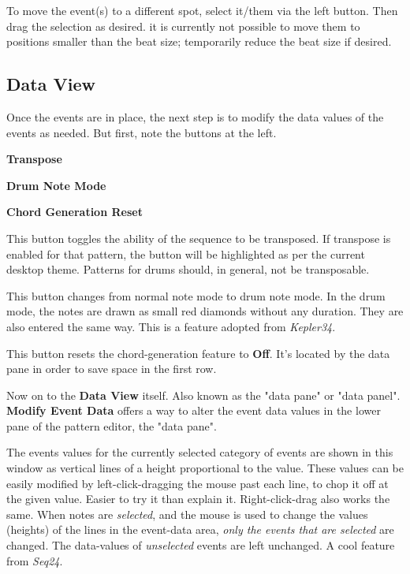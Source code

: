    To move the event(s) to a different spot, select it/them via the left
   button.  Then drag the selection as desired.
   it is currently not possible to move them to positions smaller than the
   beat size; temporarily reduce the beat size if desired.

\subsection{Data View}
\label{subsec:pattern_editor_data_view}

   Once the events are in place, the next step is to modify the
   data values of the events as needed.
   But first, note the buttons at the left.

   \begin{enumber}
      \item \textbf{Transpose}
      \item \textbf{Drum Note Mode}
      \item \textbf{Chord Generation Reset}
   \end{enumber}

   \setcounter{ItemCounter}{0}      %

   This button toggles the ability of the sequence to be transposed.
   If transpose is enabled for that pattern, the button will be highlighted as
   per the current desktop theme.  Patterns for drums should, in general, not
   be transposable.

   This button changes from normal note mode to drum note mode. In the drum
   mode, the notes are drawn as small red diamonds without any duration.
   They are also entered the same way.
   This is a feature adopted from \textsl{Kepler34}.

   This button resets the chord-generation feature to \textbf{Off}.
   It's located by the data pane in order to save space in the first row.

   Now on to the \textbf{Data View} itself.
   Also known as the "data pane"
   or "data panel".
   \textbf{Modify Event Data} offers a way to
   alter the event data values in 
   the lower pane of the pattern editor, the "data pane".

   The events values for the currently selected category of events are shown
   in this window as vertical lines of a height proportional to the value.
   These values can be easily modified by
   left-click-dragging the
   mouse past each line, to chop it off at the given value.  Easier to try
   it than explain it.
   Right-click-drag also works the same.
   When notes are \textsl{selected}, and the
   mouse is used to change the values (heights) of the lines in the event-data
   area, \textsl{only the events that are selected} are changed.
   The data-values of \textsl{unselected} events are left unchanged.
   A cool feature from \textsl{Seq24}.

